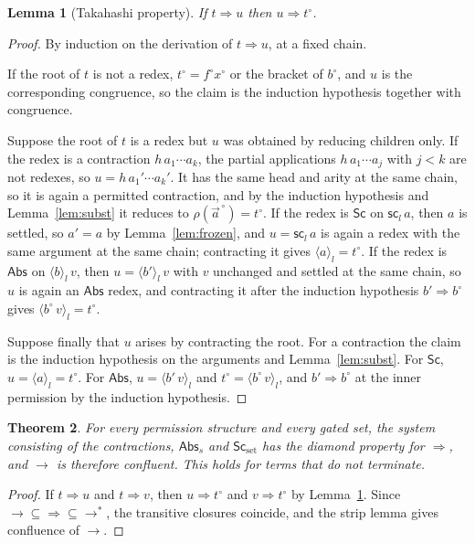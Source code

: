 \documentclass[11pt]{article}
\newtheorem{theorem}{Theorem}
\newtheorem{lemma}[theorem]{Lemma}
\theoremstyle{definition}
\newcommand{\red}{\rightarrow}
\newcommand{\pa}{\Rightarrow}
\newcommand{\Sc}{\mathsf{Sc}}
\newcommand{\Abs}{\mathsf{Abs}}
\newcommand{\scn}[1]{\mathsf{sc}_{#1}}
\newcommand{\br}[2]{\langle #1\rangle_{#2}}
\begin{document}
\begin{lemma}[Takahashi property]\label{lem:tak}
If $t\pa u$ then $u\pa t^\circ$.
\end{lemma}
\begin{proof}
By induction on the derivation of $t\pa u$, at a fixed chain.

If the root of $t$ is not a redex, $t^\circ=f^\circ x^\circ$ or the bracket of $b^\circ$, and $u$ is the corresponding congruence, so the claim is the induction hypothesis together with congruence.

Suppose the root of $t$ is a redex but $u$ was obtained by reducing children only. If the redex is a contraction $h\,a_1\cdots a_k$, the partial applications $h\,a_1\cdots a_j$ with $j<k$ are not redexes, so $u=h\,a_1'\cdots a_k'$. It has the same head and arity at the same chain, so it is again a permitted contraction, and by the induction hypothesis and Lemma~\ref{lem:subst} it reduces to $\rho(\vec a^{\,\circ})=t^\circ$. If the redex is $\Sc$ on $\scn{l}\,a$, then $a$ is settled, so $a'=a$ by Lemma~\ref{lem:frozen}, and $u=\scn{l}\,a$ is again a redex with the same argument at the same chain; contracting it gives $\br{a}{l}=t^\circ$. If the redex is $\Abs$ on $\br{b}{l}\,v$, then $u=\br{b'}{l}\,v$ with $v$ unchanged and settled at the same chain, so $u$ is again an $\Abs$ redex, and contracting it after the induction hypothesis $b'\pa b^\circ$ gives $\br{b^\circ\,v}{l}=t^\circ$.

Suppose finally that $u$ arises by contracting the root. For a contraction the claim is the induction hypothesis on the arguments and Lemma~\ref{lem:subst}. For $\Sc$, $u=\br{a}{l}=t^\circ$. For $\Abs$, $u=\br{b'\,v}{l}$ and $t^\circ=\br{b^\circ\,v}{l}$, and $b'\pa b^\circ$ at the inner permission by the induction hypothesis.
\end{proof}

\begin{theorem}\label{thm:main}
For every permission structure and every gated set, the system consisting of the contractions, $\Abs_s$ and $\Sc_{\mathrm{set}}$ has the diamond property for $\pa$, and $\red$ is therefore confluent. This holds for terms that do not terminate.
\end{theorem}
\begin{proof}
If $t\pa u$ and $t\pa v$, then $u\pa t^\circ$ and $v\pa t^\circ$ by Lemma~\ref{lem:tak}. Since $\red\subseteq\pa\subseteq\red^{*}$, the transitive closures coincide, and the strip lemma gives confluence of $\red$.
\end{proof}
\end{document}
